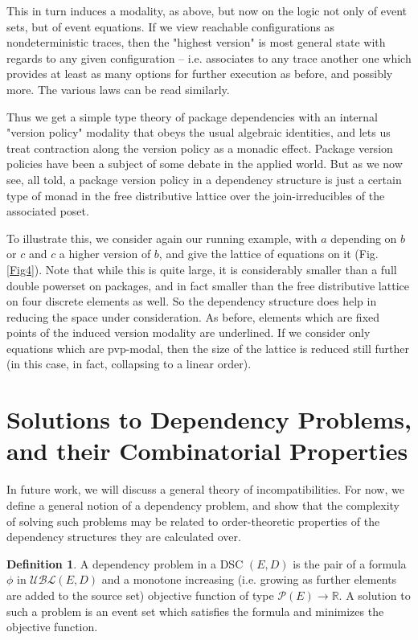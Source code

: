 \documentclass[hoptionsi,review,format=acmsmall]{acmart}
\theoremstyle{definition}
\newtheorem{definition}{Definition}[section]
\newcommand{\UBLc}{\mathcal{UBL}}
\newcommand{\Pc}{\mathcal{P}}
\begin{document}
This in turn induces a modality, as above, but now on the logic not only of event sets, but of event equations. If we view reachable configurations as nondeterministic traces, then the "highest version" is most general state with regards to any given configuration -- i.e. associates to any trace another one which provides at least as many options for further execution as before, and possibly more. The various laws can be read similarly. %

Thus we get a simple type theory of package dependencies with an internal "version policy" modality that obeys the usual algebraic identities, and lets us treat contraction along the version policy as a monadic effect. Package version policies have been a subject of some debate in the applied world. But as we now see, all told, a package version policy in a dependency structure is just a certain type of monad in the free distributive lattice over the join-irreducibles of the associated poset.

To illustrate this, we consider again our running example, with \(a\) depending on \(b\) or \(c\) and \(c\) a higher version of \(b\), and give the lattice of equations on it (Fig. \ref{Fig4}). Note that while this is quite large, it is considerably smaller than a full double powerset on packages, and in fact smaller than the free distributive lattice on four discrete elements as well. So the dependency structure does help in reducing the space under consideration. As before, elements which are fixed points of the induced version modality are underlined. If we consider only equations which are pvp-modal, then the size of the lattice is reduced still further (in this case, in fact, collapsing to a linear order).


\section{Solutions to Dependency Problems, and their Combinatorial Properties}
In future work, we will discuss a general theory of incompatibilities. For now, we define a general notion of a dependency problem, and show that the complexity of solving such problems may be related to order-theoretic properties of the dependency structures they are calculated over.

\begin{definition}
A dependency problem in a DSC \((E,D)\) is the pair of a formula \(\phi\) in \(\UBLc(E,D)\) and a monotone increasing (i.e. growing as further elements are added to the source set) objective function of type \(\Pc(E) \rightarrow \mathbb{R}\). A solution to such a problem is an event set which satisfies the formula and minimizes the objective function.
\end{definition}
\end{document}
